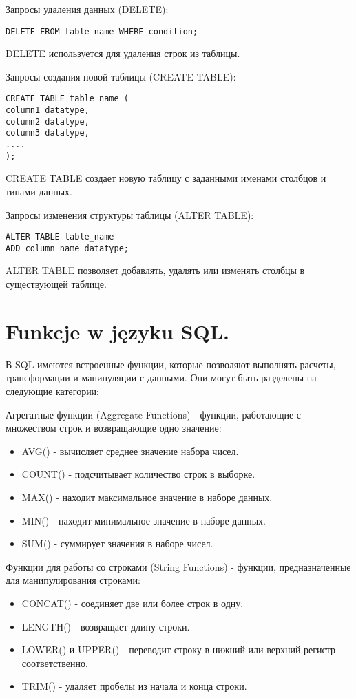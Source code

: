 Запросы удаления данных (DELETE):
\begin{verbatim}
DELETE FROM table_name WHERE condition;
\end{verbatim}
DELETE используется для удаления строк из таблицы.

Запросы создания новой таблицы (CREATE TABLE):
\begin{verbatim}
CREATE TABLE table_name (
column1 datatype,
column2 datatype,
column3 datatype,
....
);
\end{verbatim}
CREATE TABLE создает новую таблицу с заданными именами столбцов и типами данных.

Запросы изменения структуры таблицы (ALTER TABLE):
\begin{verbatim}
ALTER TABLE table_name
ADD column_name datatype;
\end{verbatim}
ALTER TABLE позволяет добавлять, удалять или изменять столбцы в существующей таблице.


\section{Funkcje w języku SQL.}

В SQL имеются встроенные функции, которые позволяют выполнять расчеты, трансформации и манипуляции с данными. Они могут быть разделены на следующие категории:

Агрегатные функции (Aggregate Functions) - функции, работающие с множеством строк и возвращающие одно значение:
\begin{itemize}
\item AVG() - вычисляет среднее значение набора чисел.
\item COUNT() - подсчитывает количество строк в выборке.
\item MAX() - находит максимальное значение в наборе данных.
\item MIN() - находит минимальное значение в наборе данных.
\item SUM() - суммирует значения в наборе чисел.
\end{itemize}

Функции для работы со строками (String Functions) - функции, предназначенные для манипулирования строками:
\begin{itemize}
\item CONCAT() - соединяет две или более строк в одну.
\item LENGTH() - возвращает длину строки.
\item LOWER() и UPPER() - переводит строку в нижний или верхний регистр соответственно.
\item TRIM() - удаляет пробелы из начала и конца строки.
\end{itemize}

